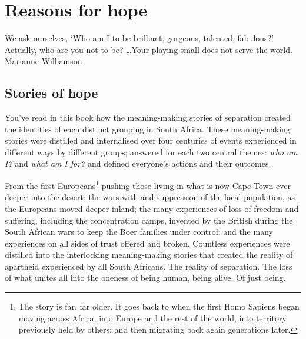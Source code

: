 ﻿\chapter{Reasons for hope}




\begin{chapterquotation}
We ask ourselves, ‘Who am I to be brilliant, gorgeous, talented, fabulous?’ Actually, who are you not to be? \ldots Your playing small does not serve the world.\\
\raggedleft \textemdash Marianne Williamson   
\end{chapterquotation}  


\section{Stories of hope}
You've read in this book how the meaning-making stories of separation created the identities of each distinct grouping in South Africa. These meaning-making stories were distilled and internalised over four centuries of events experienced in different ways by different groups; answered for each two central themes: \emph{who am I?} and \emph{what am I for?} and defined everyone’s actions and their outcomes.


From the first Europeans\footnote{The story is far, far older. It goes back to when the first Homo Sapiens began moving across Africa, into Europe and the rest of the world, into territory previously held by others; and then migrating back again generations later.} pushing those living in what is now Cape Town ever deeper into the desert; the wars with and suppression of the local population, as the Europeans moved deeper inland; the many experiences of loss of freedom and suffering, including the concentration camps, invented by the British during the South African wars to keep the Boer families under control; and the many experiences on all sides of trust offered and broken. Countless experiences were distilled into the interlocking meaning-making stories that created the reality of apartheid experienced by all South Africans. The reality of separation. The loss of what unites all into the oneness of being human, being alive. Of just being.


